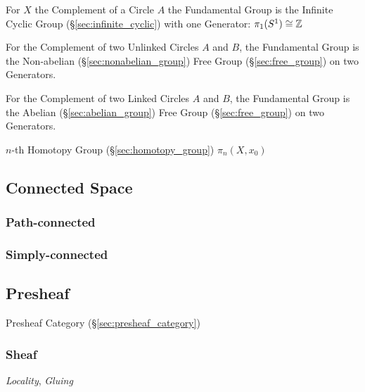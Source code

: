 For $X$ the Complement of a Circle $A$ the Fundamental Group is the
Infinite Cyclic Group (\S\ref{sec:infinite_cyclic}) with one
Generator: $\pi_1(S^1) \cong \mathbb{Z}$

For the Complement of two Unlinked Circles $A$ and $B$, the
Fundamental Group is the Non-abelian (\S\ref{sec:nonabelian_group})
Free Group (\S\ref{sec:free_group}) on two Generators.

For the Complement of two Linked Circles $A$ and $B$, the Fundamental
Group is the Abelian (\S\ref{sec:abelian_group}) Free Group
(\S\ref{sec:free_group}) on two Generators. \cite{hatcher02}

$n$-th Homotopy Group (\S\ref{sec:homotopy_group}) $\pi_n(X,x_0)$



\subsection{Connected Space}\label{sec:connected_space}

\subsubsection{Path-connected}\label{sec:path_connected}

\subsubsection{Simply-connected}\label{sec:simply_connected}



\subsection{Presheaf}\label{sec:presheaf}

Presheaf Category (\S\ref{sec:presheaf_category})



\subsubsection{Sheaf}\label{sec:sheaf}

\emph{Locality}, \emph{Gluing}

